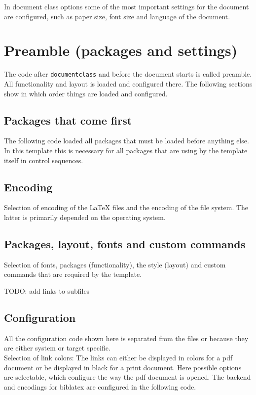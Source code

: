In document class options some of the most important settings for the document are configured, such as paper size, font size and language of the document.

\section{Preamble (packages and settings)}
The code after \texttt{documentclass} and before the document starts is called preamble. All functionality and layout is loaded and configured there. The following sections show in which order things are loaded and configured.

\subsection{Packages that come first}
The following code loaded all packages that must be loaded before anything else. In this template this is necessary for all packages that are using by the template itself in control sequences.

\subsection{Encoding}
Selection of encoding of the LaTeX files and the encoding of the file system. The latter is primarily depended on the operating system.

\subsection{Packages, layout, fonts and custom commands}
Selection of fonts, packages (functionality), the style (layout) and custom commands that are required by the template.

TODO: add links to subfiles

\subsection{Configuration}
All the configuration code shown here is separated from the files  or  because they are either system or target specific.
\medskip\\\noindent
%
Selection of link colors: The links can either be displayed in colors for a pdf document or be displayed in black for a print document.
%
Here possible options are selectable, which configure the way the pdf document is opened.
%
The backend and encodings for biblatex are configured in the following code.

